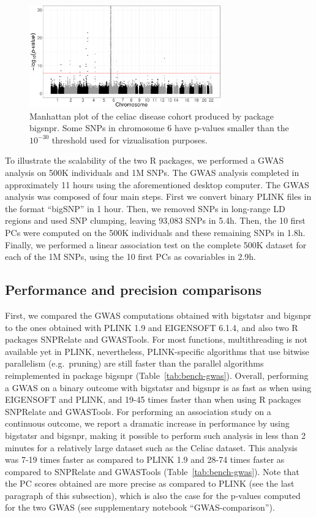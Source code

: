 \documentclass{bioinfo}
\begin{document}
\begin{figure}[!tpb]
\centerline{\includegraphics[width=235pt]{celiac-gwas-cut}}
\caption{Manhattan plot of the celiac disease cohort produced by package bigsnpr. Some SNPs in chromosome 6 have p-values smaller than the $10^{-30}$ threshold used for vizualisation purposes.}\label{fig:gwas}
\end{figure}

To illustrate the scalability of the two R packages, we performed a GWAS analysis on 500K individuals and 1M SNPs. The GWAS analysis completed in approximately 11 hours using the aforementioned desktop computer. The GWAS analysis was composed of four main steps. 
First we convert binary PLINK files in the format ``bigSNP'' in 1 hour.
Then, we removed SNPs in long-range LD regions and used SNP clumping, leaving 93,083 SNPs in 5.4h. Then, the 10 first PCs were computed on the 500K individuals and these remaining SNPs in 1.8h. Finally, we performed a linear association test on the complete 500K dataset for each of the 1M SNPs, using the 10 first PCs as covariables in 2.9h.

\subsection{Performance and precision comparisons}

First, we compared the GWAS computations obtained with bigstatsr and bigsnpr to the ones obtained with PLINK 1.9 and EIGENSOFT 6.1.4, and also two R packages SNPRelate and GWASTools.
For most functions, multithreading is not available yet in PLINK, nevertheless, PLINK-specific algorithms that use bitwise parallelism (e.g.\ pruning) are still faster than the parallel algorithms reimplemented in package bigsnpr (Table~\ref{tab:bench-gwas}). 
Overall, performing a GWAS on a binary outcome with bigstatsr and bigsnpr is as fast as when using EIGENSOFT and PLINK, and 19-45 times faster than when using R packages SNPRelate and GWASTools. 
For performing an association study on a continuous outcome, we report a dramatic increase in performance by using bigstatsr and bigsnpr, making it possible to perform such analysis in less than 2 minutes for a relatively large dataset such as the Celiac dataset. This analysis was 7-19 times faster as compared to PLINK 1.9 and 28-74 times faster as compared to SNPRelate and GWASTools (Table~\ref{tab:bench-gwas}).
Note that the PC scores obtained are more precise as compared to PLINK (see the last paragraph of this subsection), which is also the case for the p-values computed for the two GWAS (see supplementary notebook ``GWAS-comparison''). 
\end{document}
